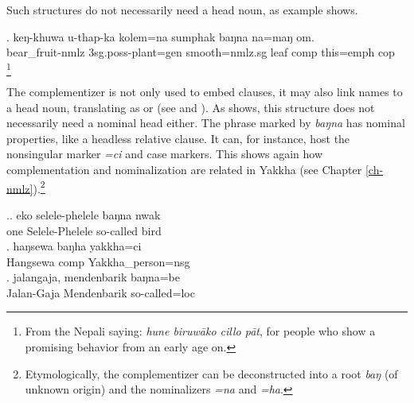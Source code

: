 Such structures do not necessarily need a head noun, as example \Next shows.

\exg. keŋ-khuwa            u-thap-ka              kolem=na         sumphak baŋna        na=maŋ     om.\\
bear\_fruit{\sc -nmlz} {\sc 3sg.poss-}plant{\sc =gen} smooth{\sc =nmlz.sg} leaf    comp this{\sc =emph} {\sc cop}\\
\footnote{From the Nepali saying: \emph{hune biruwāko cillo pāt}, for people who show a promising behavior from an early age on.}



The complementizer is not only used to embed clauses, it may also link names to a head noun, translating as  or  (see \Next[a] and \Next[b]). As  \Next[c] shows, this structure does not necessarily need a nominal head either. The phrase marked by \emph{baŋna} has nominal properties, like a headless relative clause. It can, for instance, host the nonsingular marker \emph{=ci} and case markers. This shows again how complementation and nominalization are related in Yakkha (see Chapter \ref{ch-nmlz}).\footnote{Etymologically, the complementizer can be deconstructed into a root \emph{baŋ} (of unknown origin) and the nominalizers \emph{=na} and \emph{=ha}.}

\ex.\ag. eko selele-phelele baŋna nwak\\
one Selele-Phelele so-called bird\\
 
\bg. haŋsewa       baŋha         yakkha=ci\\
Hangsewa {\sc comp} Yakkha\_person{\sc =nsg}\\
 
\bg.   jalangaja, mendenbarik baŋna=be   \\
Jalan-Gaja Mendenbarik so-called{\sc =loc}\\
  


 	